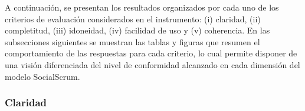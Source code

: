 A continuación, se presentan los resultados organizados por cada uno de los criterios de evaluación considerados en el instrumento: (i) claridad, (ii) completitud, (iii) idoneidad,
(iv) facilidad de uso y (v) coherencia. En las subsecciones siguientes se muestran las tablas y figuras que resumen el comportamiento de las respuestas para cada criterio, lo cual permite disponer de una visión diferenciada del nivel de conformidad alcanzado en cada dimensión del modelo SocialScrum.

\subsubsection{Claridad}
\begingroup
\scriptsize
\renewcommand{\arraystretch}{1.4}
\setlength{\tabcolsep}{4pt}
\setlength{\LTleft}{0pt}
\setlength{\LTright}{0pt}

